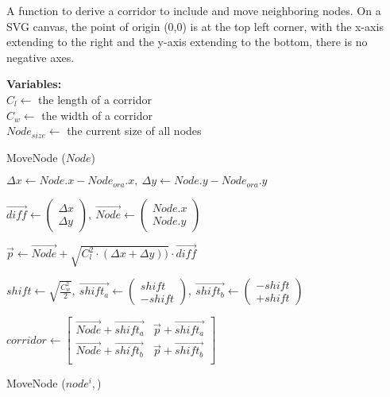 \begin{algorithm}[hbt!]
    \caption{A function to derive a corridor to include and move neighboring nodes. On a SVG canvas, the point of origin (0,0) is at the top left corner, with the x-axis extending to the right and the y-axis extending to the bottom, there is no negative axes.}\label{alg:derive corridor}
    \textbf{Variables:} \\
    $C_l \gets$ the length of a corridor \\
    $C_{w} \gets$ the width of a corridor \\
    $Node_{size}\gets$ the current size of all nodes \\
    \begin{algorithmic}[1]
        \State MoveNode ($ Node $)

        \State $ \Delta x \gets Node.x - Node_{ora}.x,~ \Delta y \gets Node.y - Node_{ora}.y $

        \State $ \vec{diff} \gets
            \begin{pmatrix}
                \Delta x \\
                \Delta y
            \end{pmatrix},~ \vec{Node} \gets
            \begin{pmatrix}
                    Node.x \\
                    Node.y
            \end{pmatrix} $

        \State $ \vec{p} \gets
            \vec{Node} + \sqrt{
                C_{l}^2 \cdot (\Delta x + \Delta y))
            } \cdot \vec{diff} $
        
        \State $ shift \gets
                \sqrt{ 
                    \frac{C_{w}^2}{2}
                },~ \vec{shift_a} \gets \begin{pmatrix}
                    shift \\
                    - shift
                \end{pmatrix},~ \vec{shift_b} \gets \begin{pmatrix}
                    - shift \\
                    +shift
                \end{pmatrix} $

        \State $ corridor \gets
            \begin{bmatrix}
                \vec{Node} + \vec{shift_a} &
                \vec{p}+ \vec{shift_a} \\

                \vec{Node} + \vec{shift_b} &
                \vec{p}+ \vec{shift_b} \\
            \end{bmatrix} $

            \State MoveNode ($ node^i,  $)
        \EndFor

        \EndFunction
    \end{algorithmic}
\end{algorithm}
